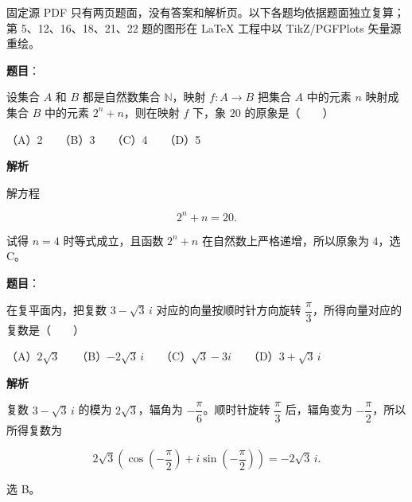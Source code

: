 

\begin{gktip}
固定源 PDF 只有两页题面，没有答案和解析页。以下各题均依据题面独立复算；第 5、12、16、18、21、22 题的图形在 LaTeX 工程中以 TikZ/PGFPlots 矢量源重绘。
\end{gktip}


\begin{answer}

\textbf{题目}：

设集合 $A$ 和 $B$ 都是自然数集合 $\mathbb N$，映射 $f:A\to B$ 把集合 $A$ 中的元素 $n$ 映射成集合 $B$ 中的元素 $2^n+n$，则在映射 $f$ 下，象 $20$ 的原象是\mbox{（　　）}

（A）2　　（B）3　　（C）4　　（D）5

\textbf{解析}

解方程

\nopagebreak[4]
\[
2^n+n=20.
\]

试得 $n=4$ 时等式成立，且函数 $2^n+n$ 在自然数上严格递增，所以原象为 $4$，选 C。


\end{answer}
\begin{answer}

\textbf{题目}：

在复平面内，把复数 $3-\sqrt3\,i$ 对应的向量按顺时针方向旋转 $\dfrac\pi3$，所得向量对应的复数是\mbox{（　　）}

（A）$2\sqrt3$　　（B）$-2\sqrt3\,i$　　（C）$\sqrt3-3i$　　（D）$3+\sqrt3\,i$

\textbf{解析}

复数 $3-\sqrt3\,i$ 的模为 $2\sqrt3$，辐角为 $-\dfrac\pi6$。顺时针旋转 $\dfrac\pi3$ 后，辐角变为 $-\dfrac\pi2$，所以所得复数为

\nopagebreak[4]
\[
2\sqrt3\left(\cos\left(-\frac\pi2\right)+i\sin\left(-\frac\pi2\right)\right)
=-2\sqrt3\,i.
\]

选 B。


\end{answer}
